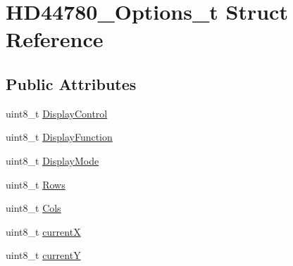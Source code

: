 \hypertarget{struct_h_d44780___options__t}{}\section{H\+D44780\+\_\+\+Options\+\_\+t Struct Reference}
\label{struct_h_d44780___options__t}
\subsection*{Public Attributes}
\begin{DoxyCompactItemize}
\item 
uint8\+\_\+t \hyperlink{struct_h_d44780___options__t_aed1944b2c81fcd127027656a1aeb728e}{Display\+Control}
\item 
uint8\+\_\+t \hyperlink{struct_h_d44780___options__t_ae097cb598557255e744da8452e6d7d96}{Display\+Function}
\item 
uint8\+\_\+t \hyperlink{struct_h_d44780___options__t_a1b35879fbf92ef75056a03d7480adeba}{Display\+Mode}
\item 
uint8\+\_\+t \hyperlink{struct_h_d44780___options__t_a68d23667da79372ed89149bf8457caab}{Rows}
\item 
uint8\+\_\+t \hyperlink{struct_h_d44780___options__t_a28905366e0f6914c460923c66bafedcb}{Cols}
\item 
uint8\+\_\+t \hyperlink{struct_h_d44780___options__t_adb9e4eaa0d1e01e293e12f39aa47f321}{currentX}
\item 
uint8\+\_\+t \hyperlink{struct_h_d44780___options__t_ac77fb48e30acdfbf71b6c9967759f034}{currentY}
\end{DoxyCompactItemize}



